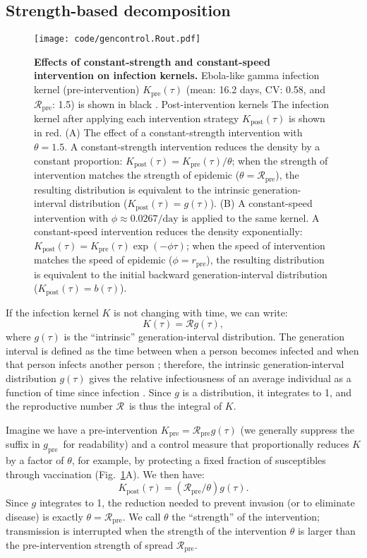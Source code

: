 \documentclass[12pt]{article}
\newcommand{\RR}{\ensuremath{{\mathcal R}}}
\newcommand{\Rx}[1]{\ensuremath{\RR_{\mathrm{#1}}}}
\newcommand{\Rpre}{\Rx{pre}}
\newcommand{\KK}{\ensuremath{{K}}}
\newcommand{\Kx}[1]{\ensuremath{\KK_{\mathrm{#1}}}}
\newcommand{\Kpre}{\Kx{pre}}
\newcommand{\Kpost}{\Kx{post}}
\newcommand{\ggg}{\ensuremath{{g}}}
\newcommand{\gx}[1]{\ensuremath{\ggg_{\mathrm{#1}}}}
\newcommand{\gpre}{\gx{pre}}
\newcommand{\rr}{\ensuremath{{r}}}
\newcommand{\rx}[1]{\ensuremath{\rr_{\mathrm{#1}}}}
\newcommand{\rpre}{\rx{pre}}
\newcommand{\figref}[1]{Fig.~\ref{fig:#1}}
\newcommand{\figlab}[1]{\label{fig:#1}}
\newcommand{\eqlab}[1]{\label{eq:#1}}
\begin{document}
\subsection{Strength-based decomposition}

\begin{figure}[!t]
\texttt{[image: code/gencontrol.Rout.pdf]}
\caption{
\textbf{Effects of constant-strength and constant-speed intervention on infection kernels.}
Ebola-like gamma infection kernel (pre-intervention) $\Kpre(\tau)$ (mean: 16.2 days, CV: 0.58, and \Rpre: 1.5) is shown in black \citep{park2019practical}.
Post-intervention kernels The infection kernel after applying each intervention strategy $\Kpost(\tau)$ is shown in red.
(A) The effect of a constant-strength intervention with $\theta = 1.5$.
A constant-strength intervention reduces the density by a constant proportion: $\Kpost(\tau) = \Kpre(\tau)/\theta$; when the strength of intervention matches the strength of epidemic ($\theta = \Rpre$), the resulting distribution is equivalent to the intrinsic generation-interval distribution ($\Kpost(\tau) = g(\tau)$).
(B) A constant-speed intervention with $\phi \approx 0.0267/\mathrm{day}$ is applied to the same kernel.
A constant-speed intervention reduces the density exponentially: $\Kpost(\tau) = \Kpre(\tau) \exp(-\phi \tau)$; when the speed of intervention matches the speed of epidemic ($\phi = \rpre$), the resulting distribution is equivalent to the initial backward generation-interval distribution ($\Kpost(\tau) = b(\tau)$). 
}
\figlab{constant}
\end{figure}

If the infection kernel $K$ is not changing with time, we can write:
\begin{equation}
	K(\tau) = \RR g(\tau),
	\eqlab{strengthFactors}
\end{equation}
where $g(\tau)$ is the ``intrinsic'' generation-interval distribution.
The generation interval is defined as the time between when a person becomes infected and when that person infects another person \citep{svensson2007note};
therefore, the intrinsic generation-interval distribution $g(\tau)$ gives the relative infectiousness of an average individual as a function of time since infection \citep{champredon2015intrinsic}. 
Since $g$ is a distribution, it integrates to 1, and the reproductive number \RR\ is thus the integral of $K$.

Imagine we have a pre-intervention $\Kpre = \Rpre g(\tau)$ (we generally suppress the suffix in \gpre\ for readability) and a control measure that proportionally reduces $K$ by a factor of $\theta$, for example, by protecting a fixed fraction of susceptibles through vaccination (\figref{constant}A). We then have:
\begin{equation}
	\Kpost(\tau) = (\Rpre/\theta) g(\tau).
\end{equation}
Since $g$ integrates to 1, the reduction needed to prevent invasion (or to eliminate disease) is exactly $\theta=\Rpre$. We call $\theta$ the ``strength'' of the intervention; transmission is interrupted when the strength of the intervention $\theta$ is larger than the pre-intervention strength of spread $\Rpre$.
\end{document}
